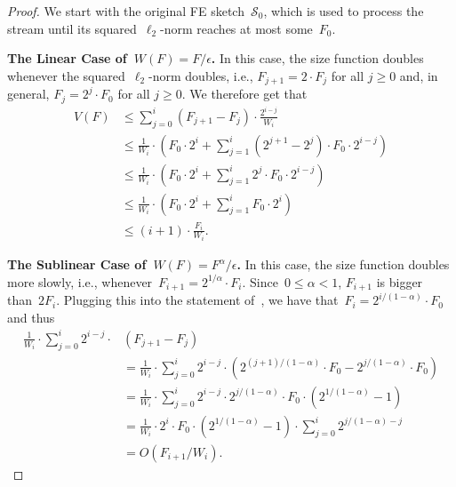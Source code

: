 \documentclass[sigconf]{acmart}
\newcommand{\parentheses}[1]{\left(#1\right)}
\begin{document}
\begin{proof}
    We start with the original FE sketch~$\mathcal{S}_0$, which is used to
    process the stream until its squared~$\ell_2${\nobreakdash-}norm reaches at
    most some~$F_0$.

    \textbf{The Linear Case of~$W(F)=F/\epsilon$.}
    In this case, the size function doubles whenever the
    squared~$\ell_2${\nobreakdash-}norm doubles, i.e., $F_{j+1} = 2
    \cdot F_j$ for all $j\geq 0$ and, in general, $F_j = 2^j \cdot F_0$ for all
    $j\geq 0$. We therefore get that
    \begin{align*}
        V(F) &\leq  \sum_{j=0}^{i}  \parentheses{F_{j+1} - F_j} \cdot \frac{2^{i-j}}{W_i} \\
        & \leq \frac{1}{W_i} \cdot \parentheses{ F_0 \cdot 2^{i} + \sum_{j=1}^{i}  \parentheses{2^{j+1} - 2^j} \cdot F_0 \cdot 2^{i-j}} \\
        & \leq \frac{1}{W_i} \cdot  \parentheses{ F_0 \cdot 2^{i} +  \sum_{j=1}^{i}  2^j \cdot F_0 \cdot 2^{i-j}} \\
        & \leq \frac{1}{W_i} \cdot  \parentheses{ F_0 \cdot 2^{i} +  \sum_{j=1}^{i}  F_0 \cdot 2^i} \\
        & \leq (i+1) \cdot \frac{F_i}{W_i}.
    \end{align*}

\medskip\noindent
\textbf{The Sublinear Case of~$W(F)=F^{\alpha}/\epsilon$.}
    In this case, the size function doubles more slowly, i.e.,
    whenever~$F_{i+1} = 2^{1/\alpha} \cdot F_i$. Since~$0 \leq \alpha < 1$,
    $F_{i+1}$ is bigger than~$2F_i$. Plugging this into the statement
    of~, we have that~$F_i = 2^{i/(1-\alpha)} \cdot F_0$ and
    thus
    \begin{align*}
        \frac{1}{W_i} \cdot \sum_{j=0}^i  2^{i-j} \cdot & (F_{j+1} - F_j) \\
        & = \frac{1}{W_i} \cdot \sum_{j=0}^i  2^{i-j} \cdot \parentheses{2^{(j+1)/(1-\alpha)}\cdot F_0 - 2^{j/(1-\alpha)} \cdot F_0} \\
        & = \frac{1}{W_i} \cdot \sum_{j=0}^i  2^{i-j} \cdot 2^{j/(1-\alpha)} \cdot F_0 \cdot \parentheses{2^{1/(1-\alpha)}-1} \\
        & = \frac{1}{W_i} \cdot 2^i \cdot F_0 \cdot \parentheses{2^{1/(1-\alpha)}-1} \cdot \sum_{j=0}^i 2^{j/(1-\alpha) - j} \\
        & = O(F_{i+1}/W_i).
    \end{align*}	
\end{proof}
\end{document}
